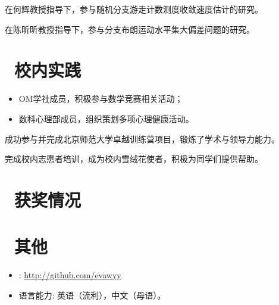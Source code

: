 \documentclass{resume}
\begin{document}
在何辉教授指导下，参与随机分支游走计数测度收敛速度估计的研究。

在陈昕昕教授指导下，参与分支布朗运动水平集大偏差问题的研究。

\section{\faBell\ 校内实践}
\begin{itemize}
	\item OM学社成员，积极参与数学竞赛相关活动；
	\item 数科心理部成员，组织策划多项心理健康活动。
\end{itemize}

成功参与并完成北京师范大学卓越训练营项目，锻炼了学术与领导力能力。

完成校内志愿者培训，成为校内雪绒花使者，积极为同学们提供帮助。

\section{\faHeartO\ 获奖情况}

\section{\faInfo\ 其他}
\begin{itemize}[parsep=0.5ex]
	\item \faGithub: \href{http://github.com/evawyy}{http://github.com/evawyy}
	\item 语言能力: 英语（流利），中文（母语）。
\end{itemize}

%
%
\end{document}

